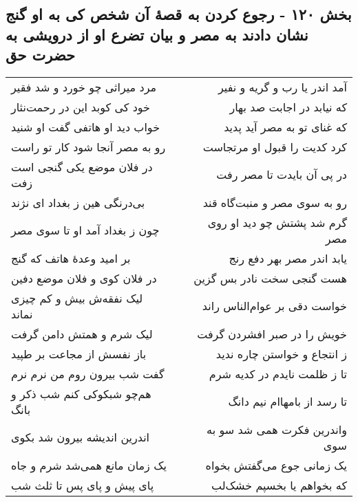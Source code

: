 \begin{center}
\section*{بخش ۱۲۰ - رجوع کردن به قصهٔ آن شخص کی به او گنج نشان دادند به مصر و بیان تضرع او از درویشی به حضرت حق}
\label{sec:sh120}
\begin{longtable}{l p{0.5cm} r}
مرد میراثی چو خورد و شد فقیر
&&
آمد اندر یا رب و گریه و نفیر
\\
خود کی کوبد این در رحمت‌نثار
&&
که نیابد در اجابت صد بهار
\\
خواب دید او هاتفی گفت او شنید
&&
که غنای تو به مصر آید پدید
\\
رو به مصر آنجا شود کار تو راست
&&
کرد کدیت را قبول او مرتجاست
\\
در فلان موضع یکی گنجی است زفت
&&
در پی آن بایدت تا مصر رفت
\\
بی‌درنگی هین ز بغداد ای نژند
&&
رو به سوی مصر و منبت‌گاه قند
\\
چون ز بغداد آمد او تا سوی مصر
&&
گرم شد پشتش چو دید او روی مصر
\\
بر امید وعدهٔ هاتف که گنج
&&
یابد اندر مصر بهر دفع رنج
\\
در فلان کوی و فلان موضع دفین
&&
هست گنجی سخت نادر بس گزین
\\
لیک نفقه‌ش بیش و کم چیزی نماند
&&
خواست دقی بر عوام‌الناس راند
\\
لیک شرم و همتش دامن گرفت
&&
خویش را در صبر افشردن گرفت
\\
باز نفسش از مجاعت بر طپید
&&
ز انتجاع و خواستن چاره ندید
\\
گفت شب بیرون روم من نرم نرم
&&
تا ز ظلمت نایدم در کدیه شرم
\\
هم‌چو شبکوکی کنم شب ذکر و بانگ
&&
تا رسد از بامهاام نیم دانگ
\\
اندرین اندیشه بیرون شد بکوی
&&
واندرین فکرت همی شد سو به سوی
\\
یک زمان مانع همی‌شد شرم و جاه
&&
یک زمانی جوع می‌گفتش بخواه
\\
پای پیش و پای پس تا ثلث شب
&&
که بخواهم یا بخسپم خشک‌لب
\\
\end{longtable}
\end{center}
